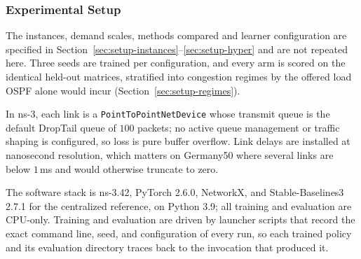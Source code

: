 \subsubsection{Experimental Setup}
The instances, demand scales, methods compared and learner configuration are
specified in Section~\ref{sec:setup-instances}--\ref{sec:setup-hyper} and are not
repeated here. Three seeds are trained per configuration, and every arm is scored
on the identical held-out matrices, stratified into congestion regimes by the
offered load OSPF alone would incur (Section~\ref{sec:setup-regimes}).

In ns-3, each link is a \texttt{PointToPointNetDevice} whose transmit queue is
the default DropTail queue of $100$ packets; no active queue management or
traffic shaping is configured, so loss is pure buffer overflow. Link delays are
installed at nanosecond resolution, which matters on Germany50 where several
links are below $1$\,ms and would otherwise truncate to zero.

The software stack is ns-3.42, PyTorch 2.6.0, NetworkX, and Stable-Baselines3
2.7.1 for the centralized reference, on Python 3.9; all training and evaluation
are CPU-only. Training and evaluation are driven by launcher scripts that record the exact
command line, seed, and configuration of every run, so each trained policy and its
evaluation directory traces back to the invocation that produced it.
